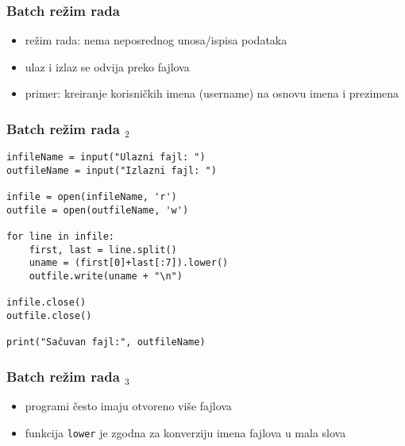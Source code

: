 \documentclass[utf8,compress,aspectratio=169]{beamer}
\begin{document}
\begin{frame}[fragile]
  \frametitle{Batch režim rada}
  \begin{itemize}
    \item {} režim rada: nema neposrednog unosa/ispisa podataka
    \item ulaz i izlaz se odvija preko fajlova
    \item primer: kreiranje korisničkih imena (username) na osnovu imena i prezimena
  \end{itemize}
\end{frame}

\begin{frame}[fragile]
  \frametitle{Batch režim rada $_2$}
\begin{verbatim}
infileName = input("Ulazni fajl: ")
outfileName = input("Izlazni fajl: ")

infile = open(infileName, 'r')
outfile = open(outfileName, 'w')

for line in infile:
    first, last = line.split()
    uname = (first[0]+last[:7]).lower()
    outfile.write(uname + "\n")

infile.close()
outfile.close()

print("Sačuvan fajl:", outfileName)
\end{verbatim}
\end{frame}

\begin{frame}[fragile]
  \frametitle{Batch režim rada $_3$}
  \begin{itemize}
    \item programi često imaju otvoreno više fajlova
    \item funkcija \texttt{lower} je zgodna za konverziju imena fajlova u mala slova
  \end{itemize}
\end{frame}
\end{document}
